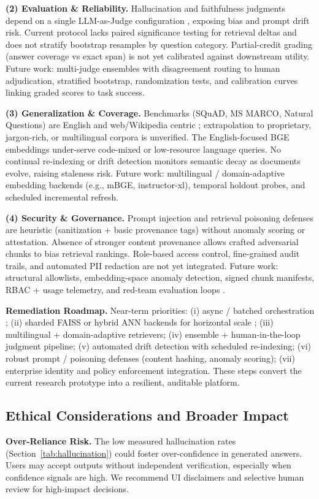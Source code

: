 \documentclass[conference]{IEEEtran}
\begin{document}
	\textbf{(2) Evaluation \& Reliability.} Hallucination and faithfulness judgments depend on a single LLM-as-Judge configuration \cite{llm_judge,hallucination_survey}, exposing bias and prompt drift risk. Current protocol lacks paired significance testing for retrieval deltas and does not stratify bootstrap resamples by question category. Partial-credit grading (answer coverage vs exact span) is not yet calibrated against downstream utility. Future work: multi-judge ensembles with disagreement routing to human adjudication, stratified bootstrap, randomization tests, and calibration curves linking graded scores to task success.

	\textbf{(3) Generalization \& Coverage.} Benchmarks (SQuAD, MS MARCO, Natural Questions) are English and web/Wikipedia centric \cite{squad,msmarco,naturalquestions}; extrapolation to proprietary, jargon-rich, or multilingual corpora is unverified. The English-focused BGE embeddings under-serve code-mixed or low-resource language queries. No continual re-indexing or drift detection monitors semantic decay as documents evolve, raising staleness risk. Future work: multilingual / domain-adaptive embedding backends (e.g., mBGE, instructor-xl), temporal holdout probes, and scheduled incremental refresh.

	\textbf{(4) Security \& Governance.} Prompt injection and retrieval poisoning defenses are heuristic (sanitization + basic provenance tags) without anomaly scoring or attestation. Absence of stronger content provenance allows crafted adversarial chunks to bias retrieval rankings. Role-based access control, fine-grained audit trails, and automated PII redaction are not yet integrated. Future work: structural allowlists, embedding-space anomaly detection, signed chunk manifests, RBAC + usage telemetry, and red-team evaluation loops \cite{privacyinternational,edpb}.

	\textbf{Remediation Roadmap.} Near-term priorities: (i) async / batched orchestration \cite{langchainjs}; (ii) sharded FAISS or hybrid ANN backends for horizontal scale \cite{johnson2019faiss}; (iii) multilingual + domain-adaptive retrievers; (iv) ensemble + human-in-the-loop judgment pipeline; (v) automated drift detection with scheduled re-indexing; (vi) robust prompt / poisoning defenses (content hashing, anomaly scoring); (vii) enterprise identity and policy enforcement integration. These steps convert the current research prototype into a resilient, auditable platform.

\subsection{Ethical Considerations and Broader Impact}
\label{sec:ethics}
	\textbf{Over-Reliance Risk.} The low measured hallucination rates (Section~\ref{tab:hallucination}) could foster over-confidence in generated answers. Users may accept outputs without independent verification, especially when confidence signals are high. We recommend UI disclaimers and selective human review for high-impact decisions.
\end{document}
